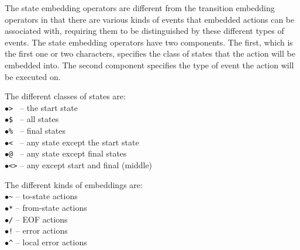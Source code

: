 \documentclass[letterpaper,11pt,oneside]{book}
\begin{document}
The state embedding operators are different from the transition embedding
operators in that there are various kinds of events that embedded actions can
be associated with, requiring them to be distinguished by these different types
of events. The state embedding operators have two components.  The first, which
is the first one or two characters, specifies the class of states that the
action will be embedded into. The second component specifies the type of event
the action will be executed on. 

\def\fakeitem{\hspace*{12pt}$\bullet$\hspace*{10pt}}

\begin{minipage}{\textwidth}
\begin{multicols}{2}
\raggedcolumns
\noindent The different classes of states are:\\
\fakeitem \verb|> | -- the start state \\
\fakeitem \verb|$ | -- all states\\
\fakeitem \verb|% | -- final states\\
\fakeitem \verb|< | -- any state except the start state\\
\fakeitem \verb|@ | -- any state except final states\\
\fakeitem \verb|<>| -- any except start and final (middle)

\columnbreak

\noindent The different kinds of embeddings are:\\
\fakeitem \verb|~| -- to-state actions\\
\fakeitem \verb|*| -- from-state actions\\
\fakeitem \verb|/| -- EOF actions\\
\fakeitem \verb|!| -- error actions\\
\fakeitem \verb|^| -- local error actions\\
\end{multicols}
\end{minipage}
%

\end{document}
